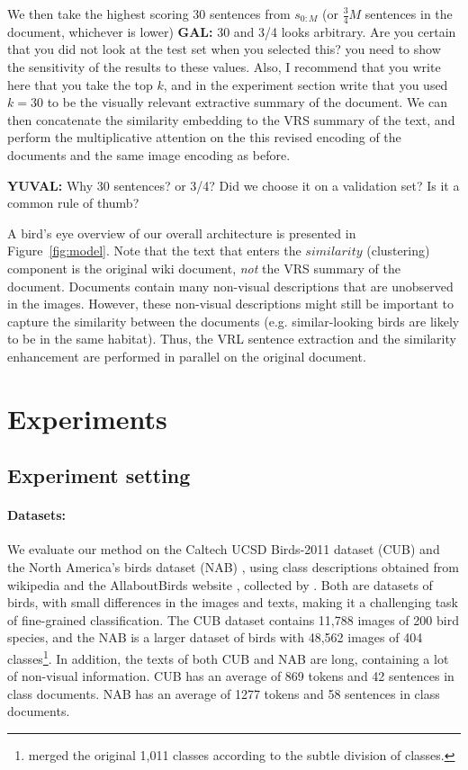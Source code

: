 \documentclass[11pt,a4paper]{article}
\newcommand\gal[1]{\textcolor{bright}{\textbf{GAL:} #1 }}
\newcommand\yuval[1]{\textcolor{darkpink}{\textbf{YUVAL:} #1 }}
\newcommand\reut[1]{\textcolor{green}{\textbf{REUT:} #1 }}
\begin{document}
We then take the highest scoring  30 sentences from \(s_{0:M}\) (or $\frac{3}{4}M$ sentences in the document, whichever is lower) \gal{30 and 3/4 looks arbitrary. Are you certain that you did not look at the test set when you selected this? you need to show the sensitivity of the results to these values. Also, I recommend that you write here that you take the top $k$, and in the experiment section write that you used $k=30$} to be the visually relevant extractive summary of the document. We can then concatenate the similarity embedding to the VRS summary of the text, and perform the multiplicative attention on the this  revised encoding of the documents and the same image encoding as before.\par
\yuval{Why 30 sentences? or 3/4? Did we choose it on a validation set? Is it a common rule of thumb?}

A bird's eye 
overview of our overall architecture is presented in Figure~\ref{fig:model}.
Note that the text that enters the $similarity$  (clustering) component is the original wiki document, {\em not} the VRS summary of the document. Documents contain many non-visual descriptions that are unobserved in the images. However, these non-visual descriptions might still be important to capture the similarity between the documents (e.g. similar-looking birds are likely to be in the same habitat). Thus, the VRL sentence extraction and the similarity enhancement are performed in parallel on the original document. 
\section{Experiments}

\subsection{Experiment setting}

\paragraph{Datasets:}  We evaluate our method on the Caltech UCSD Birds-2011 dataset (CUB) \citet{wah2011caltech} and the North America’s birds dataset (NAB) \cite{van2015building}, using class descriptions obtained from wikipedia and the AllaboutBirds website \cite{AllaboutBirds}, collected by \citet{elhoseiny2017link}. 
Both are datasets of birds, with small differences in the images and texts, making it a challenging task of fine-grained classification. The CUB dataset contains 11,788 images of 200 bird species, and the NAB
is a larger dataset of birds with 48,562 images of 404 classes\footnote{\citet{elhoseiny2017link} merged the original 1,011 classes according to the subtle division of classes.}.
In addition, the texts of both CUB and NAB are long, containing a lot of non-visual information. CUB has an average of 869 tokens and 42 sentences in class documents. NAB has an average of 1277 tokens and 58 sentences in class documents. 
\end{document}
